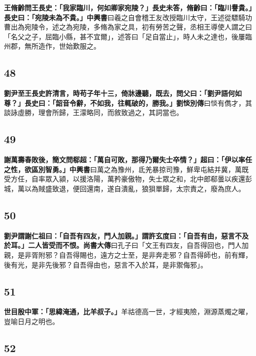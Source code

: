 \textbf{王脩齡問王長史：「我家臨川，何如卿家宛陵？」長史未答，脩齡曰：「臨川譽貴。」長史曰：「宛陵未為不貴。」}{\footnotesize \textbf{中興書}曰羲之自會稽王友改授臨川太守，王述從驃騎功曹出為宛陵令，述之為宛陵，多脩為家之具，初有勞苦之聲，丞相王導使人謂之曰「名父之子，屈臨小縣，甚不宜爾」，述答曰「足自當止」，時人未之達也，後屢臨州郡，無所造作，世始歎服之。}

\subsection*{48}

\textbf{劉尹至王長史許清言，時苟子年十三，倚牀邊聽，既去，問父曰：「劉尹語何如尊？」長史曰：「韶音令辭，不如我，往輒破的，勝我。」}{\footnotesize \textbf{劉惔別傳}曰惔有儁才，其談詠虛勝，理會所歸，王濛略同，而敘致過之，其詞當也。}

\subsection*{49}

\textbf{謝萬壽春敗後，簡文問郗超：「萬自可敗，那得乃爾失士卒情？」超曰：「伊以率任之性，欲區別智勇。」}{\footnotesize \textbf{中興書}曰萬之為豫州，氐羌暴掠司豫，鮮卑屯結并冀，萬既受方任，自率眾入潁，以援洛陽，萬矜豪傲物，失士眾之和，北中郎郗曇以疾還彭城，萬以為賊盛致退，便回還南，遂自潰亂，狼狽單歸，太宗責之，廢為庶人。}

\subsection*{50}

\textbf{劉尹謂謝仁祖曰：「自吾有四友，門人加親。」謂許玄度曰：「自吾有由，惡言不及於耳。」二人皆受而不恨。}{\footnotesize \textbf{尚書大傳}曰孔子曰「文王有四友，自吾得回也，門人加親，是非胥附邪？自吾得賜也，遠方之士至，是非奔走邪？自吾得師也，前有輝，後有光，是非先後邪？自吾得由也，惡言不入於耳，是非禦侮邪」。}

\subsection*{51}

\textbf{世目殷中軍：「思緯淹通，比羊叔子。」}{\footnotesize 羊祜德高一世，才經夷險，淵源蒸燭之曜，豈喻日月之明也。}

\subsection*{52}

